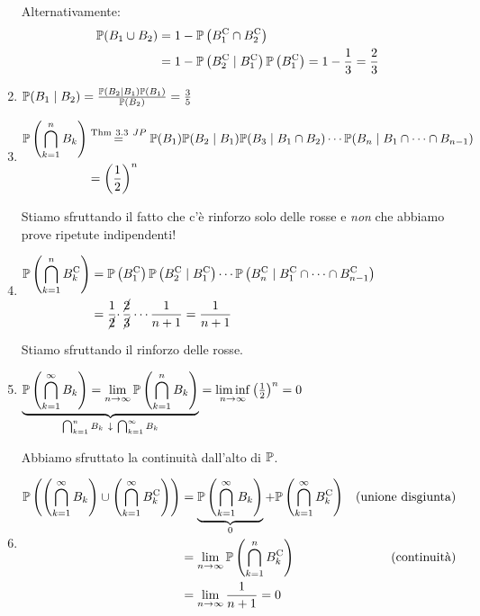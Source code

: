 \begin{enumerate}
	Alternativamente:
	\begin{align*}
		\mathbb{P}(B_{1} \cup B_{2}) & =1-\mathbb{P}\left(B_{1}^{\mathrm{C}} \cap B_{2}^{\mathrm{C}}\right)\\
		 & =1-\mathbb{P}\left(B_{2}^{\mathrm{C}} \mid B_{1}^{\mathrm{C}}\right)\mathbb{P}\left(B_{1}^{\mathrm{C}}\right) =1-\frac{1}{3} =\frac{2}{3}
	\end{align*}
	\item $\mathbb{P}(B_{1} \mid B_{2}) =\frac{\mathbb{P}(B_{2} \mid B_{1})\mathbb{P}(B_{1})}{\mathbb{P}(B_{2})} =\frac{3}{5}$
	\item $
	\begin{aligned}
		\mathbb{P}\left(\bigcap\limits_{k=1}^{n} B_{k}\right) & \overset{\text{Thm} \ 3.3\ JP}{=}\mathbb{P}(B_{1})\mathbb{P}(B_{2} \mid B_{1})\mathbb{P}(B_{3} \mid B_{1} \cap B_{2}) \cdots \mathbb{P}(B_{n} \mid B_{1} \cap \cdots \cap B_{n-1})\\
		 & =\left(\frac{1}{2}\right)^{n}
	\end{aligned}$
	
	Stiamo sfruttando il fatto che c'è rinforzo solo delle rosse e \textit{non} che abbiamo prove ripetute indipendenti!
	\item $
	\begin{aligned}
		\mathbb{P}\left(\bigcap\limits_{k=1}^{n} B_{k}^{\mathrm{C}}\right) & =\mathbb{P}\left(B_{1}^{\mathrm{C}}\right)\mathbb{P}\left(B_{2}^{\mathrm{C}} \mid B_{1}^{\mathrm{C}}\right) \cdots \mathbb{P}\left(B_{n}^{\mathrm{C}} \mid B_{1}^{\mathrm{C}} \cap \cdots \cap B_{n-1}^{\mathrm{C}}\right)\\
		 & =\frac{1}{\cancel{2}} \cdotp \frac{\cancel{2}}{\cancel{3}} \cdots \frac{1}{n+1} =\frac{1}{n+1}
	\end{aligned}$

	Stiamo sfruttando il rinforzo delle rosse.
	\item $\underbrace{\mathbb{P}\left(\bigcap\limits_{k=1}^{\infty } B_{k}\right) =\lim\limits_{n\rightarrow \infty }\mathbb{P}\left(\bigcap\limits_{k=1}^{n} B_{k}\right)}_{\bigcap_{k=1}^{n} B_{k} \ \downarrow \ \bigcap_{k=1}^{\infty } B_{k}} =\liminf\limits_{n\rightarrow \infty }\left(\frac{1}{2}\right)^{n} =0$

	Abbiamo sfruttato la continuità dall'alto di $\mathbb{P}$.
	\item $
	\begin{aligned}
		\mathbb{P}\left(\left(\bigcap\limits_{k=1}^{\infty } B_{k}\right) \cup \left(\bigcap\limits_{k=1}^{\infty } B_{k}^{\mathrm{C}}\right)\right) & =\underbrace{\mathbb{P}\left(\bigcap\limits_{k=1}^{\infty } B_{k}\right)}_{0} +\mathbb{P}\left(\bigcap\limits_{k=1}^{\infty } B_{k}^{\mathrm{C}}\right) & \text{(unione disgiunta)}\\
		 & =\lim\limits_{n\rightarrow \infty }\mathbb{P}\left(\bigcap\limits_{k=1}^{n} B_{k}^{\mathrm{C}}\right) & \text{(continuità)}\\
		 & =\lim\limits_{n\rightarrow \infty }\frac{1}{n+1} =0 & 
	\end{aligned}$

\end{enumerate}

\Soluzione